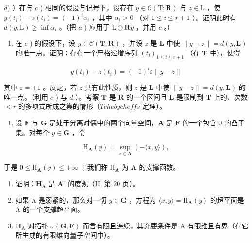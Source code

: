 \(d)\) ）在与 \(c\) ) 相同的假设与记号下，设存在 \(y \in \mathcal{C}(\mathrm{T}; \mathbf{R})\) 与 \(z \in \mathrm{L}\) ，使 \(y(t_i) - z(t_i) = (-1)^i \alpha_i\) ，其中 \(\alpha_i > 0\) （对 \(1 \leqslant i \leqslant r + 1\) ）。证明此时有 \(d(y, \mathrm{L}) \geqslant \inf \alpha_i\) 。（把 \(a\) ) 应用于 \(\mathrm{L} \oplus \mathbf{R}y\) ，并用 \(c\) 。）

\begin{enumerate}
\def\labelenumi{\alph{enumi})}
\setcounter{enumi}{4}
\tightlist
\item
  在 \(c\) ) 的假设下，设 \(y \in \mathcal{C}(\mathbf{T};\mathbf{R})\) ，并设 \(z\) 是 \(\mathbf{L}\) 中使 \(\| y - z \| = d(y,\mathbf{L})\) 的唯一点。证明：存在一个严格递增序列 \((t_i)_{1\leqslant i\leqslant r + 1}\) （在 \(\mathbf{T}\) 中），使得
\end{enumerate}

\[
y (t _ {i}) - z (t _ {i}) = (- 1) ^ {i} \varepsilon \| y - z \|
\]

其中 \(\varepsilon = \pm 1\) 。反之，若 \(z\) 具有此性质，则 \(z\) 是 \(\mathbf{L}\) 中使 \(\| y - z \| = d(y, \mathbf{L})\) 的唯一点。（利用 \(c\) ) 与 \(d\) ）。考察 \(\mathbf{T}\) 是 \(\mathbf{R}\) 的一个区间且 \(\mathbf{L}\) 是限制到 \(\mathbf{T}\) 上的、次数 \(< r\) 的多项式所成之集的情形（\(Tchebycheffs\) 定理）。

\begin{enumerate}
\def\labelenumi{\arabic{enumi})}
\setcounter{enumi}{8}
\tightlist
\item
  设 \(\mathbf{F}\) 与 \(\mathbf{G}\) 是处于分离对偶中的两个向量空间，\(\mathbf{A}\) 是 \(\mathbf{F}\) 的一个包含 0 的凸子集。对每个 \(y \in \mathbf{G}\) ，令
\end{enumerate}

\[
\mathrm{H} _ {\mathbf {A}} (y) = \sup _ {x \in \mathbf {A}} (- \langle x, y \rangle),
\]

于是 \(0 \leqslant \mathrm{H}_{\mathbf{A}}(y) \leqslant +\infty\) ；我们称 \(\mathrm{H}_{\mathbf{A}}\) 为 \(\mathbf{A}\) 的支撑函数。

\begin{enumerate}
\def\labelenumi{\alph{enumi})}
\item
  证明：\(\mathbf{H}_{\mathrm{A}}\) 是 \(\mathbf{A}^{\circ}\) 的度规（II, 第 20 页）。
\item
  如果 A 是弱紧的，那么对一切 \(y \in \mathbf{G}\) ，方程为 \(\langle x, y \rangle = \mathrm{H}_{\mathbf{A}}(y)\) 的超平面是 A 的一个支撑超平面。
\item
  \(\mathbf{H}_{\mathrm{A}}\) 对拓扑 \(\sigma (\mathbf{G},\mathbf{F})\) 而言有限且连续，其充要条件是 A 有限维且有界（在它所生成的有限维向量子空间中）。
\end{enumerate}

